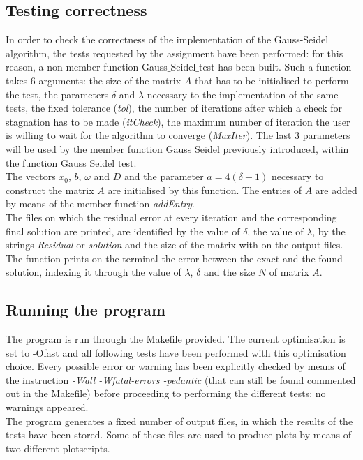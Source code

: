 \documentclass{article}
\theoremstyle{theorem}
\theoremstyle{definition}
\begin{document}
\subsection{Testing correctness}
In order to check the correctness of the implementation of the Gauss-Seidel algorithm, the tests requested by the assignment have been performed: for this reason, a non-member function Gauss$\_$Seidel$\_$test has been built. Such a function takes 6 arguments: the size of the matrix $A$ that has to be initialised to perform the test, the parameters $\delta$ and $\lambda$ necessary to the implementation of the same tests, the fixed tolerance (\emph{tol}), the number of iterations after which a check for stagnation has to be made (\emph{itCheck}), the maximum number of iteration the user is willing to wait for the algorithm to converge (\emph{MaxIter}). The last 3 parameters will be used by the member function Gauss$\_$Seidel previously introduced, within the function Gauss$\_$Seidel$\_$test.\\
The vectors $x_0$, $b$, $\omega$ and $D$ and the parameter $a=4(\delta-1)$ necessary to construct the matrix $A$ are initialised by this function. The entries of $A$ are added by means of the member function \emph{addEntry}.\\
The files on which the residual error at every iteration and the corresponding final solution are printed, are identified by the value of $\delta$, the value of $\lambda$, by the strings \emph{Residual} or \emph{solution} and the size of the matrix with on the output files.\\
The function prints on the terminal the error between the exact and the found solution, indexing it through the value of $\lambda$, $\delta$ and the size $N$ of matrix $A$.\\

\subsection{Running the program}
The program is run through the Makefile provided. The current optimisation is set to -Ofast and all following tests have been performed with this optimisation choice. Every possible error or warning has been explicitly checked by means of the instruction \emph{-Wall -Wfatal-errors -pedantic} (that can still be found commented out in the Makefile) before proceeding to performing the different tests: no warnings appeared.\\
The program generates a fixed number of output files, in which the results of the tests have been stored. Some of these files are used to produce plots by means of two different plotscripts.\\
\end{document}
